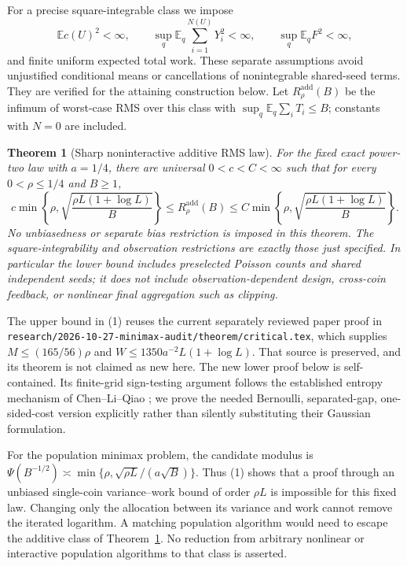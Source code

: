 \documentclass[11pt]{article}
\newtheorem{theorem}{Theorem}
\newcommand{\E}{\mathbb E}
\begin{document}
For a precise square-integrable class we impose
\[
 \E c(U)^2<\infty,\qquad
 \sup_q\E_q\sum_{i=1}^{N(U)}Y_i^2<\infty,\qquad
 \sup_q\E_q F^2<\infty,
\]
and finite uniform expected total work. These separate assumptions avoid
unjustified conditional means or cancellations of nonintegrable shared-seed
terms. They are verified for the attaining construction below. Let
$R^{\mathrm{add}}_\rho(B)$ be the infimum of worst-case RMS over this class
with $\sup_q\E_q\sum_iT_i\le B$; constants with $N=0$ are included.

\begin{theorem}[Sharp noninteractive additive RMS law]\label{thm:additive}
For the fixed exact power-two law with $a=1/4$, there are universal
$0<c<C<\infty$ such that for every $0<\rho\le1/4$ and $B\ge1$,
\[
 c\min\left\{\rho,\sqrt{\frac{\rho L(1+\log L)}{B}}\right\}
 \le R^{\mathrm{add}}_\rho(B)
 \le C\min\left\{\rho,\sqrt{\frac{\rho L(1+\log L)}{B}}\right\}.
                                                               \tag{1c}
\]
No unbiasedness or separate bias restriction is imposed in this theorem.
The square-integrability and observation restrictions are exactly those just
specified. In particular the lower bound includes preselected Poisson counts
and shared independent seeds; it does not include observation-dependent
design, cross-coin feedback, or nonlinear final aggregation such as clipping.
\end{theorem}

The upper bound in (1) reuses the current separately reviewed paper proof in
\texttt{research/2026-10-27-minimax-audit/theorem/critical.tex}, which supplies
$M\le(165/56)\rho$ and $W\le1350a^{-2}L(1+\log L)$.
That source is preserved, and its theorem is not claimed as new here.
The new lower proof below is self-contained. Its finite-grid sign-testing
argument follows the established entropy mechanism of Chen--Li--Qiao
\cite[Lemma 4.1 and Appendix D]{clq}; we prove the needed Bernoulli,
separated-gap, one-sided-cost version explicitly rather than silently
substituting their Gaussian formulation.

For the population minimax problem, the candidate modulus is
$\Psi(B^{-1/2})\asymp\min\{\rho,\sqrt{\rho L}/(a\sqrt B)\}$.
Thus (1) shows that a proof through an unbiased single-coin variance--work
bound of order $\rho L$ is impossible for this fixed law. Changing only the
allocation between its variance and work cannot remove the iterated logarithm.
A matching population algorithm would need to escape the additive class of
Theorem~\ref{thm:additive}. No reduction from arbitrary nonlinear or
interactive population algorithms to that class is asserted.
\end{document}

